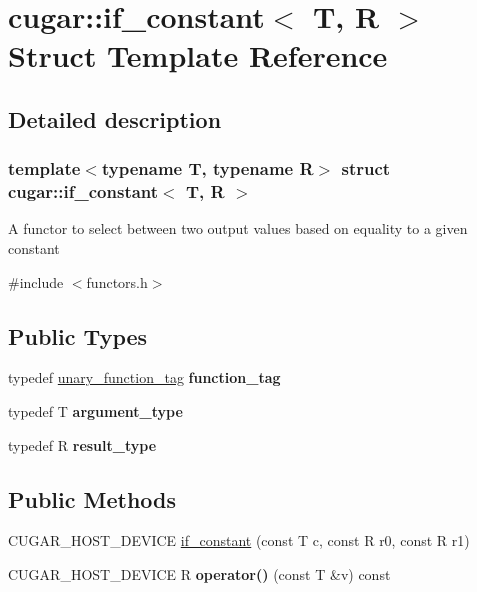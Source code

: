 \hypertarget{structcugar_1_1if__constant}{}\section{cugar\+:\+:if\+\_\+constant$<$ T, R $>$ Struct Template Reference}
\label{structcugar_1_1if__constant}


\subsection{Detailed description}
\subsubsection*{template$<$typename T, typename R$>$\newline
struct cugar\+::if\+\_\+constant$<$ T, R $>$}

A functor to select between two output values based on equality to a given constant 

{\ttfamily \#include $<$functors.\+h$>$}

\subsection*{Public Types}
\begin{DoxyCompactItemize}
\item 
\mbox{\label{structcugar_1_1if__constant_ada35cd698be964ddb1241ab1d5619572}} 
typedef \hyperlink{structcugar_1_1unary__function__tag}{unary\+\_\+function\+\_\+tag} {\bfseries function\+\_\+tag}
\item 
\mbox{\label{structcugar_1_1if__constant_a556f0bef0bb0da89f26c8045a6533d73}} 
typedef T {\bfseries argument\+\_\+type}
\item 
\mbox{\label{structcugar_1_1if__constant_a6db32c9baffde58c3e87201808a154a0}} 
typedef R {\bfseries result\+\_\+type}
\end{DoxyCompactItemize}
\subsection*{Public Methods}
\begin{DoxyCompactItemize}
\item 
C\+U\+G\+A\+R\+\_\+\+H\+O\+S\+T\+\_\+\+D\+E\+V\+I\+CE \hyperlink{structcugar_1_1if__constant_a86a62f5771592414a15ee2bc2029352e}{if\+\_\+constant} (const T c, const R r0, const R r1)
\item 
\mbox{\label{structcugar_1_1if__constant_a1f595bf54abb6a850da069dbc2faaf0c}} 
C\+U\+G\+A\+R\+\_\+\+H\+O\+S\+T\+\_\+\+D\+E\+V\+I\+CE R {\bfseries operator()} (const T \&v) const
\end{DoxyCompactItemize}


